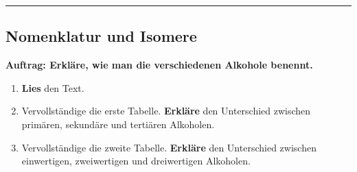 \documentclass{scrartcl}  %
\begin{document}
			\begin{center}
				\noindent\rule{18cm}{0.1pt}
			\end{center}
						
\newpage						
			\subsection{Nomenklatur und Isomere}
			
				\noindent \textbf{Auftrag: Erkläre, wie man die verschiedenen Alkohole benennt.}
				\begin{enumerate}
					\item \textbf{Lies} den Text.
					\item Vervollständige die erste Tabelle. \textbf{Erkläre} den Unterschied zwischen primären, sekundäre und tertiären Alkoholen.
					\item Vervollständige die zweite Tabelle. \textbf{Erkläre} den Unterschied zwischen einwertigen, zweiwertigen und dreiwertigen Alkoholen.
				\end{enumerate}
				
				
				
\end{document}
